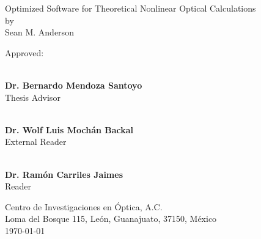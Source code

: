 \begin{titlingpage*}

\begin{center}
    \vspace*{1cm}
    {\LARGE Optimized Software for Theoretical Nonlinear Optical Calculations}\\
    \vspace{0.7cm}
    {\large by}\\
    \vspace{0.7cm}
    {\Large Sean M. Anderson}
\end{center}

\vfill
{\Large Approved:}

\begin{flushright}

\vspace*{1cm}

\makebox[0.5\textwidth ]{\hrulefill}\\
\textbf{Dr. Bernardo Mendoza Santoyo}\\ Thesis Advisor
\vspace{1.25cm}

\makebox[0.5\textwidth ]{\hrulefill}\\
\textbf{Dr. Wolf Luis Moch\'an Backal}\\ External Reader
\vspace{1.25cm}

\makebox[0.5\textwidth ]{\hrulefill}\\
\textbf{Dr. Ram\'on Carriles Jaimes}\\ Reader
\vfill

\end{flushright}

\begin{center}
    {\large 
    Centro de Investigaciones en \'Optica, A.C.\\
    Loma del Bosque 115, Le\'on, Guanajuato, 37150, M\'exico\\
    \today
    }
\end{center}

\end{titlingpage*}
